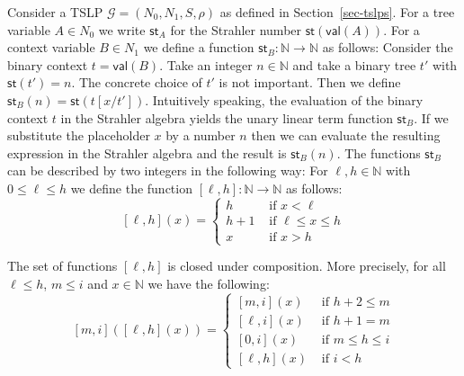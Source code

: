 \documentclass[a4paper,UKenglish,cleveref, autoref, thm-restate, numberwithinsect]{lipics-v2021}
\newcommand{\val}{\mathsf{val}}
\newcommand{\hs}{\mathsf{st}}
\begin{document}
Consider a TSLP $\mathcal{G} = (N_0, N_1, S, \rho)$ as defined in Section~\ref{sec-tslps}. For a tree variable $A \in N_0$ we write 
$\hs_A$ for the Strahler number $\hs(\val(A))$.
For a context variable $B \in N_1$ we define a function $\hs_B : \mathbb{N} \to \mathbb{N}$  as
follows: Consider the binary context $t = \val(B)$. Take an integer $n \in \mathbb{N}$ and take a binary
tree $t'$ with $\hs(t') = n$. The concrete choice of $t'$ is not important. Then we define $\hs_B(n) = \hs(t[x/t'])$.
Intuitively speaking, the evaluation of the binary context $t$ in the Strahler algebra yields the unary linear term function $\hs_B$.
If we substitute the placeholder $x$ by a number $n$ then we can evaluate the resulting expression in the Strahler
algebra and the result is $\hs_B(n)$. The functions $\hs_B$ can be described by two integers in the following way:
For $\ell,h \in \mathbb{N}$ with $0 \le \ell \leq h$ we define the function $[\ell,h] :  \mathbb{N} \to \mathbb{N}$ as follows:
\begin{equation} \label{eq-l-h}
[\ell,h](x) = \begin{cases}
h & \text{ if } x < \ell \\
h+1 & \text{ if }  \ell \le x \le h \\
x & \text{ if }  x >  h
\end{cases}
\end{equation}

\begin{lemma} \label{lemma-composition}
The set of functions $[\ell,h]$ is closed under composition. More precisely, for all $\ell \leq h$, $m \le i$ and $x \in \mathbb{N}$ we have the following:
\begin{equation} \label{eq-comp}
[m,i]([\ell,h](x)) = \begin{cases}
[m,i](x) & \text{ if } h+2 \leq m \\
[\ell,i](x) & \text{ if } h+1 = m  \\ 
[0,i](x) & \text{ if } m \le h \leq i \\
[\ell,h](x) & \text{ if } i < h 
\end{cases}
\end{equation}
\end{lemma}
\end{document}
